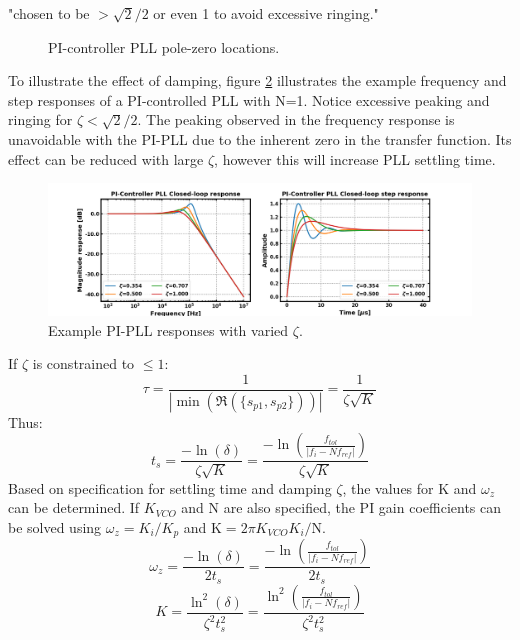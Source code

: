 			"chosen to be $>\sqrt{2}/2$ or even 1 to avoid excessive ringing."
			\begin{figure}[htb!]
				\center
				\caption{PI-controller PLL pole-zero locations.}
				\label{fig:pi_pll_pz}
			\end{figure}
			\FloatBarrier
			To illustrate the effect of damping, figure \ref{fig:pi_pll_response} illustrates the example frequency and step responses of a PI-controlled PLL with N=1. Notice excessive peaking and ringing for $\zeta<\sqrt{2}/2$. The peaking observed in the frequency response is unavoidable with the PI-PLL due to the inherent zero in the transfer function. Its effect can be reduced with large $\zeta$, however this will increase PLL settling time. 
			\begin{figure}[htb!]
				\center\includegraphics[width=1.0\textwidth, angle=0]{figs/pi_pll_response2.png}
				\caption{Example PI-PLL responses with varied $\zeta$.}
				\label{fig:pi_pll_response}
			\end{figure}
			\FloatBarrier
			If $\zeta$ is constrained to $\leq 1$:
			\begin{equation}
				\tau = \frac{1}{|\min(\Re(\{s_{p1}, s_{p2}\}))|} = \frac{1}{\zeta\sqrt{K}}
			\end{equation}
			Thus:
			\begin{equation}
				t_s = \frac{-\ln(\delta)}{\zeta\sqrt{K}} = \frac{-\ln\left(\frac{f_{tol}}{|f_i - Nf_{ref}|}\right)}{\zeta\sqrt{K}} 
			\end{equation}
			Based on specification for settling time and damping $\zeta$, the values for K and $\omega_z$ can be determined. If $K_{VCO}$ and $\mathrm{N}$ are also specified, the PI gain coefficients can be solved using $\omega_z = K_i/K_p$ and $\mathrm{K} = 2\pi K_{VCO}K_i/\mathrm{N}$.
			\begin{equation}
				\omega_z = \frac{-\ln(\delta)}{2t_s} =  \frac{-\ln\left(\frac{f_{tol}}{|f_i - Nf_{ref}|}\right)}{2t_s}
			\end{equation}
			\begin{equation}
				K = \frac{\ln^2(\delta)}{\zeta^2t_s^2} =  \frac{\ln^2\left(\frac{f_{tol}}{|f_i - Nf_{ref}|}\right)}{\zeta^2t_s^2}
			\end{equation}

